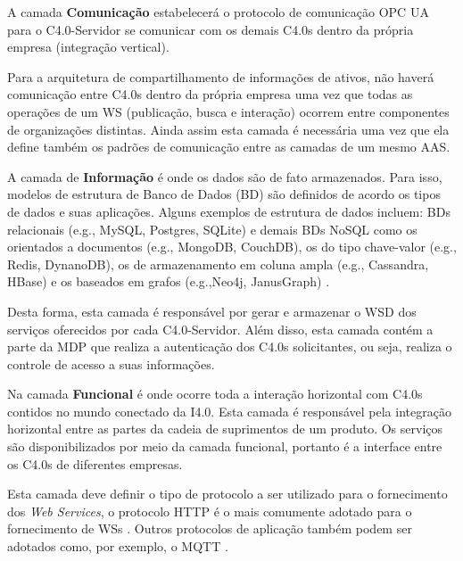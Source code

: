 	A camada \textbf{Comunicação} estabelecerá o protocolo de comunicação OPC UA para o C4.0-Servidor se comunicar com os demais C4.0s dentro da própria empresa (integração vertical).
	
	Para a arquitetura de compartilhamento de informações de ativos, não haverá comunicação entre C4.0s dentro da própria empresa uma vez que todas as operações de um WS (publicação, busca e interação) ocorrem entre componentes de organizações distintas. Ainda assim esta camada é necessária uma vez que ela define também os padrões de comunicação entre as camadas de um mesmo AAS.
	


	A camada de \textbf{Informação} é onde os dados são de fato armazenados. Para isso, modelos de estrutura de Banco de Dados (BD) são definidos de acordo os tipos de dados e suas aplicações. Alguns exemplos de estrutura de dados incluem: BDs relacionais (e.g., MySQL, Postgres, SQLite) \cite{morris2017relationaldatabase} e demais BDs NoSQL como os orientados a documentos (e.g., MongoDB, CouchDB), os do tipo chave-valor (e.g., Redis, DynanoDB), os de armazenamento em coluna ampla (e.g., Cassandra, HBase) e os baseados em grafos (e.g.,Neo4j, JanusGraph) \cite{schaefer2019nosql}.
	
	Desta forma, esta camada é responsável por gerar e armazenar o WSD dos serviços oferecidos por cada C4.0-Servidor. Além disso, esta camada contém a parte da MDP que realiza a autenticação dos C4.0s solicitantes, ou seja, realiza o controle de acesso a suas informações.
	
	Na camada \textbf{Funcional} é onde ocorre toda a interação horizontal com C4.0s contidos no mundo conectado da I4.0. Esta camada é responsável pela integração horizontal entre as partes da cadeia de suprimentos de um produto. Os serviços são disponibilizados por meio da camada funcional, portanto é a interface entre os C4.0s de diferentes empresas.
	
	Esta camada deve definir o tipo de protocolo a ser utilizado para o fornecimento dos \textit{Web Services}, o protocolo HTTP é o mais comumente adotado para o fornecimento de WSs \cite{gruner2016restful}. Outros protocolos de aplicação também podem ser adotados como, por exemplo, o MQTT \cite{yokotani2016mqtt}.
	
